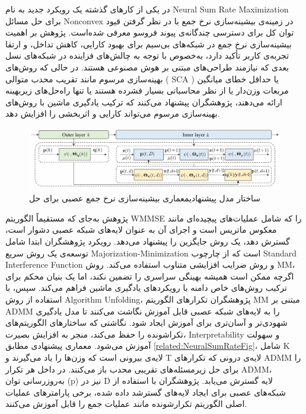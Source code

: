 در یکی از کارهای گذشته یک رویکرد جدید به نام 
\gls{Neural Sum Rate Maximization}
 برای حل مسائل
\gls{Nonconvex}
  در زمینه‌ی بیشینه‌سازی نرخ جمع با در نظر گرفتن قیود توان کل برای دسترسی چندگانه‌ی پیوند فروسو معرفی شده‌است.
 پژوهش بر اهمیت بیشینه‌سازی نرخ جمع در شبکه‌های بی‌سیم برای بهبود کارایی، کاهش تداخل، و ارتقا تجربه‌ی کاربر تأکید دارد، به‌خصوص با توجه به چالش‌های فزاینده در شبکه‌های نسل بعدی که نیازمند طراحی‌های مبتنی بر هوش مصنوعی هستند. در حالی که روش‌های بهینه‌سازی مرسوم مانند تقریب محدب متوالی (
\gls{SCA}
 ) یا حداقل خطای میانگین مربعات وزن‌دار یا از نظر محاسباتی بسیار فشرده هستند یا تنها راه‌حل‌های زیربهینه ارائه می‌دهند، پژوهشگران پیشنهاد می‌کنند که ترکیب یادگیری ماشین با روش‌های بهینه‌سازی مرسوم می‌تواند کارایی و اثربخشی را افزایش دهد.
\begin{figure}
	\centering
	\includegraphics[width=0.9\linewidth]{./Pic/NeuralSumRate_related_fig}
	\caption[ معماری بیشینه‌سازی نرخ جمع عصبی برای حل]{ساختار مدل پیشنهادیمعماری بیشینه‌سازی نرخ جمع عصبی برای حل \cite{NeuralSumRate}}
	\label{related:NeuralSumRateFig}
\end{figure}
 پژوهش به‌جای که مستقیماً الگوریتم 
\gls{WMMSE}
  را که شامل عملیات‌های پیچیده‌ای مانند معکوس ماتریس است و اجرای آن به عنوان لایه‌های شبکه عصبی دشوار است، گسترش دهد، یک روش جایگزین را پیشنهاد می‌دهد. رویکرد پژوهشگران ابتدا شامل توسعه‌ی یک روش سریع
\gls{Majorization-Minimization}
   است که از چارچوب  
\gls{Standard Interference Function}
    و روش ضرایب افزایشی متناوب استفاده می‌کند.  روش 
\gls{MM}،
 اگرچه ممکن است همیشه بهینگی سراسری را تضمین نکند، اما یک بنیان محکم برای ترکیب روش‌های خاص دامنه با رویکردهای یادگیری ماشین فراهم می‌کند.
سپس، با استفاده از روش 
\gls{Algorithm Unfolding}،
 پژوهشگران تکرارهای الگوریتم 
\gls{MM}
  مبتنی بر 
\gls{ADMM}
را به لایه‌های شبکه عصبی قابل آموزش نگاشت می‌کنند تا مدل یادگیری شهودی‌تر و آسان‌تری برای آموزش ایجاد شود. نگاشتی که ساختارهای الگوریتم‌های تکراشونده را حفظ می‌کند، منجر به افزایش بصیرت، 
\gls{Interpretability}
 و سهولت آموزش می‌شود. معماری پیشنهادی مطابق 
\autoref{related:NeuralSumRateFig}،
  شامل K لایه‌ی بیرونی است که وزن‌ها را یاد می‌گیرند و T لایه‌ی درونی که تکرارهای 
\gls{ADMM}
  را برای حل زیرمسئله‌های تقریبی محدب باز می‌کنند. در داخل هر تکرار
\gls{ADMM}،
  به‌روزرسانی توان (p) نیز در D لایه گسترش می‌یابد. پژوهشگران با استفاده از شبکه‌های عصبی برای ایجاد لایه‌های گسترشد داده شده، برخی پارامترهای عملیات اصلی الگوریتم تکرارشونده مانند عملیات جمع را قابل آموزش می‌کنند.
  

